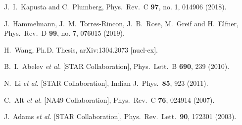 \begin{thebibliography}{99}
  J.~I.~Kapusta and C.~Plumberg,
  Phys.\ Rev.\ C {\bf 97}, no. 1, 014906 (2018).


  J.~Hammelmann, J.~M.~Torres-Rincon, J.~B.~Rose, M.~Greif and H.~Elfner,
  Phys.\ Rev.\ D {\bf 99}, no. 7, 076015 (2019).

  H.~Wang, Ph.D. Thesis,
  arXiv:1304.2073 [nucl-ex].

  B.~I.~Abelev {\it et al.} [STAR Collaboration],
  Phys.\ Lett.\ B {\bf 690}, 239 (2010).

\cite{Li:2011zzx}
  N.~Li {\it et al.} [STAR Collaboration],
  Indian J.\ Phys.\  {\bf 85}, 923 (2011).

  C.~Alt {\it et al.} [NA49 Collaboration],
  Phys.\ Rev.\ C {\bf 76}, 024914 (2007).

  J.~Adams {\it et al.} [STAR Collaboration],
  Phys.\ Rev.\ Lett.\  {\bf 90}, 172301 (2003).
   

\end{thebibliography}
